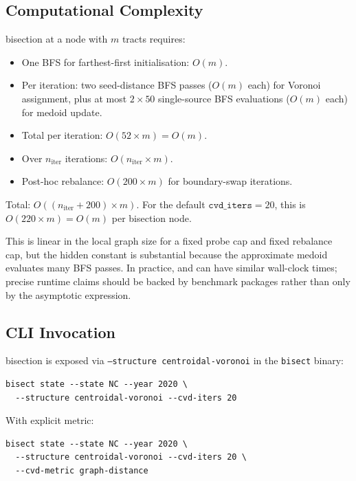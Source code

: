 \subsection{Computational Complexity}

\begin{proposition}
\label{prop:runtime}
\cvd{} bisection at a node with $m$ tracts requires:
\begin{itemize}
\item One BFS for farthest-first initialisation: $O(m)$.
\item Per iteration: two seed-distance BFS passes ($O(m)$ each) for
  Voronoi assignment, plus at most $2 \times 50$ single-source BFS
  evaluations ($O(m)$ each) for medoid update.
\item Total per iteration: $O(52 \times m) = O(m)$.
\item Over $n_{\mathrm{iter}}$ iterations: $O(n_{\mathrm{iter}} \times m)$.
\item Post-hoc rebalance: $O(200 \times m)$ for boundary-swap iterations.
\end{itemize}
Total: $O((n_{\mathrm{iter}} + 200) \times m)$.
For the default $\mathtt{cvd\_iters} = 20$, this is $O(220 \times m) = O(m)$
per bisection node.
\end{proposition}

This is linear in the local graph size for a fixed probe cap and fixed
rebalance cap, but the hidden constant is substantial because the approximate
medoid evaluates many BFS passes.
In practice, \cvd{} and \metis{} can have similar wall-clock times; precise
runtime claims should be backed by benchmark packages rather than only by the
asymptotic expression.

\subsection{CLI Invocation}

\cvd{} bisection is exposed via \texttt{--structure centroidal-voronoi}
in the \texttt{bisect} binary:

\begin{verbatim}
bisect state --state NC --year 2020 \
  --structure centroidal-voronoi --cvd-iters 20
\end{verbatim}

With explicit metric:
\begin{verbatim}
bisect state --state NC --year 2020 \
  --structure centroidal-voronoi --cvd-iters 20 \
  --cvd-metric graph-distance
\end{verbatim}

